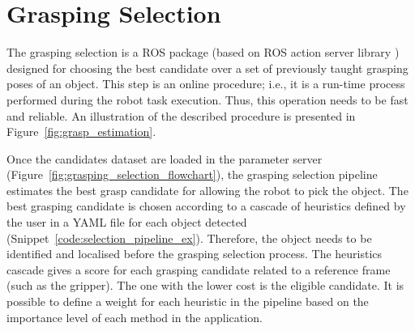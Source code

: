 \section{Grasping Selection}
\label{cap4:modular_grasping_architecture:sec:grasp_selection}

The grasping selection is a \ac{ROS} package (based on \ac{ROS} action server library \cite{ros_action_lib}) designed for choosing the best candidate over a set of previously taught grasping poses of an object. This step is an online procedure; i.e., it is a run-time process performed during the robot task execution. Thus, this operation needs to be fast and reliable. An illustration of the described procedure is presented in Figure~\ref{fig:grasp_estimation}. 

\begin{figure}[h!]
\end{figure}


Once the candidates dataset are loaded in the parameter server (Figure~\ref{fig:grasping_selection_flowchart}), the grasping selection pipeline estimates the best grasp candidate for allowing the robot to pick the object. The best grasping candidate is chosen according to a cascade of heuristics defined by the user in a YAML file for each object detected (Snippet~\ref{code:selection_pipeline_ex}). Therefore, the object needs to be identified and localised before the grasping selection process. The heuristics cascade gives a score for each grasping candidate related to a reference frame (such as the gripper). The one with the lower cost is the eligible candidate. It is possible to define a weight for each heuristic in the pipeline based on the importance level of each method in the application.


